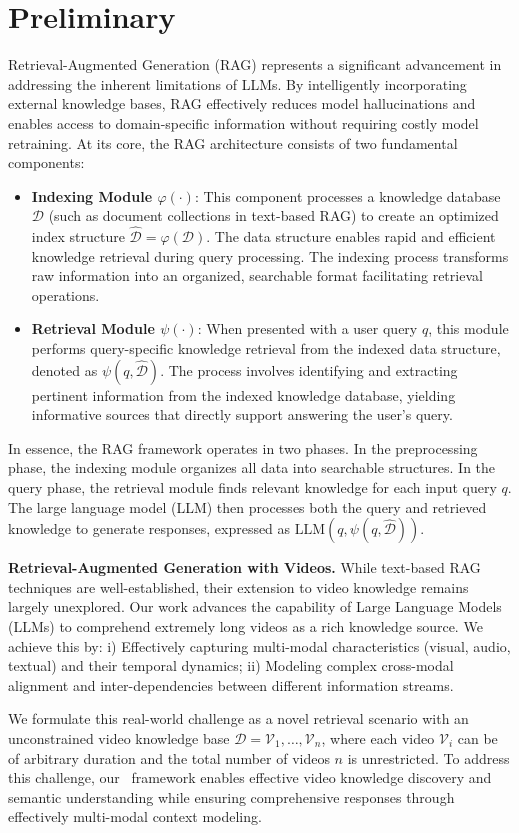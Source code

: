 \section{Preliminary}\label{sec:preliminary}

Retrieval-Augmented Generation (RAG) represents a significant advancement in addressing the inherent limitations of LLMs. By intelligently incorporating external knowledge bases, RAG effectively reduces model hallucinations and enables access to domain-specific information without requiring costly model retraining. At its core, the RAG architecture consists of two fundamental components:

\begin{itemize}[leftmargin=*]

    \item \textbf{Indexing Module $\varphi(\cdot)$}: This component processes a knowledge database $\mathcal{D}$ (such as document collections in text-based RAG) to create an optimized index structure $\hat{\mathcal{D}} = \varphi(\mathcal{D})$. The data structure enables rapid and efficient knowledge retrieval during query processing. The indexing process transforms raw information into an organized, searchable format facilitating retrieval operations.

    \item \textbf{Retrieval Module $\psi(\cdot)$}: When presented with a user query $q$, this module performs query-specific knowledge retrieval from the indexed data structure, denoted as $\psi(q, \hat{\mathcal{D}})$. The process involves identifying and extracting pertinent information from the indexed knowledge database, yielding informative sources that directly support answering the user's query.
\end{itemize}

In essence, the RAG framework operates in two phases. In the preprocessing phase, the indexing module organizes all data into searchable structures. In the query phase, the retrieval module finds relevant knowledge for each input query $q$. The large language model (LLM) then processes both the query and retrieved knowledge to generate responses, expressed as $\text{LLM}(q, \psi(q, \hat{\mathcal{D}}))$.


\textbf{Retrieval-Augmented Generation with Videos.} While text-based RAG techniques are well-established, their extension to video knowledge remains largely unexplored. Our work advances the capability of Large Language Models (LLMs) to comprehend extremely long videos as a rich knowledge source. We achieve this by: i) Effectively capturing multi-modal characteristics (visual, audio, textual) and their temporal dynamics; ii) Modeling complex cross-modal alignment and inter-dependencies between different information streams.

We formulate this real-world challenge as a novel retrieval scenario with an unconstrained video knowledge base $\mathcal{D} = {\mathcal{V}_1, \ldots, \mathcal{V}_n}$, where each video $\mathcal{V}_i$ can be of arbitrary duration and the total number of videos $n$ is unrestricted. To address this challenge, our \model\ framework enables effective video knowledge discovery and semantic understanding while ensuring comprehensive responses through effectively multi-modal context modeling.